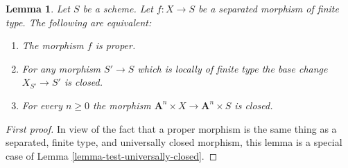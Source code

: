 \documentclass{stacks-project}
\theoremstyle{plain}
\newtheorem{lemma}[subsection]{Lemma}
\theoremstyle{definition}
\theoremstyle{remark}
\numberwithin{equation}{subsection}
\begin{document}
\begin{lemma}
\label{lemma-limited-base-change}
Let $S$ be a scheme.
Let $f : X \to S$ be a separated morphism of finite type.
The following are equivalent:
\begin{enumerate}
\item The morphism $f$ is proper.
\item For any morphism $S' \to S$ which is locally of finite type
the base change $X_{S'} \to S'$ is closed.
\item For every $n \geq 0$ the morphism
$\mathbf{A}^n \times X \to \mathbf{A}^n \times S$ is closed.
\end{enumerate}
\end{lemma}

\begin{proof}[First proof]
In view of the fact that a proper morphism is the same thing as
a separated, finite type, and universally closed morphism, this
lemma is a special case of Lemma \ref{lemma-test-universally-closed}.
\end{proof}
\end{document}
